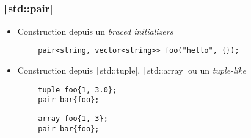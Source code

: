 \documentclass[C++.tex]{subfiles}
\begin{document}
\begin{frame}[fragile]
	\frametitle{\texttt|std::pair|}
	\begin{itemize}
		\item Construction depuis un \textit{braced initializers}

	\end{itemize}

	\begin{verbatim}
		pair<string, vector<string>> foo("hello", {});
	\end{verbatim}

	\begin{itemize}
		\item Construction depuis \texttt|std::tuple|, \texttt|std::array| ou un \textit{tuple-like}
	\end{itemize}

	\begin{verbatim}
		tuple foo{1, 3.0};
		pair bar{foo};
	\end{verbatim}

	\begin{verbatim}
		array foo{1, 3};
		pair bar{foo};
	\end{verbatim}
\end{frame}
\end{document}
